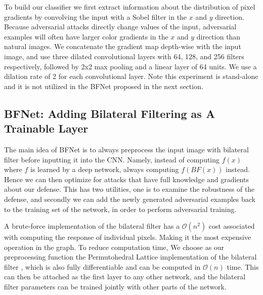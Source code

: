 \documentclass{article} %
\begin{document}
To build our classifier we first extract information about the distribution of pixel gradients by convolving the input with a Sobel filter in the $x$ and $y$ direction. Because adversarial attacks directly change values of the input, adversarial examples will often have larger color gradients in the $x$ and $y$ direction than natural images. We concatenate the gradient map depth-wise with the input image, and use three dilated convolutional layers with 64, 128, and 256 filters respectively, followed by 2x2 max pooling and a linear layer of 64 units. We use a dilation rate of 2 for each convolutional layer. Note this experiment is stand-alone and it is not utilized in the BFNet proposed in the next section.


\subsection{BFNet: Adding Bilateral Filtering as A Trainable Layer}
The main idea of BFNet is to always preprocess the input image with bilateral filter before inputting it into the CNN. Namely, instead of computing $f(x)$ where $f$ is learned by a deep network, always computing $f(BF(x))$ instead. Hence we can then optimize for attacks that have full knowledge and gradients about our defense. This has two utilities, one is to examine the robustness of the defense, and secondly we can add the newly generated adversarial examples back to the training set of the network, in order to perform adversarial training.

A brute-force implementation of the bilateral filter has a $\mathcal{O}(n^2)$ cost associated with computing the response of individual pixels. Making it the most expensive operation in the graph. To reduce computation time, We choose as our preprocessing function the Permutohedral Lattice implementation of the bilateral filter \citep{adams2010fast}, which is also fully differentiable and can be computed in $\mathcal{O}(n)$ time. This can then be attached as the first layer to any other network, and the bilateral filter parameters can be trained jointly with other parts of the network.%
\end{document}

